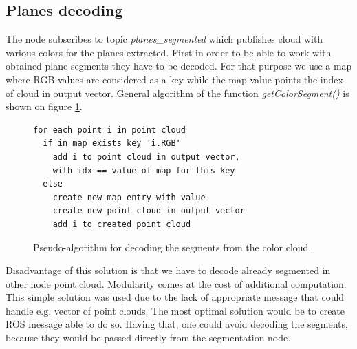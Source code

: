 \documentclass[12pt,oneside]{amsart}
\begin{document}
\subsection{Planes decoding}
The node subscribes to topic \emph{planes\_segmented} which publishes cloud with various colors for the planes extracted. First in order to be able to work with obtained plane segments they have to be decoded. For that purpose we use a map where RGB values are considered as a key while the map value points the index of cloud in output vector. General algorithm of the function \emph{getColorSegment()} is shown on figure \ref{code:algo}.

\begin{figure}[H]
\begin{lstlisting}
for each point i in point cloud
  if in map exists key 'i.RGB'
    add i to point cloud in output vector,
    with idx == value of map for this key
  else
    create new map entry with value
    create new point cloud in output vector
    add i to created point cloud
\end{lstlisting}
\caption{Pseudo-algorithm for decoding the segments from the color cloud.}
\label{code:algo}
\end{figure}

Disadvantage of this solution is that we have to decode already segmented in other node point cloud. Modularity comes at the cost of additional computation. This simple solution was used due to the lack of appropriate message that could handle e.g. vector of point clouds. The most optimal solution would be to create ROS message able to do so. Having that, one could avoid decoding the segments, because they would be passed directly from the segmentation node.
\end{document}
